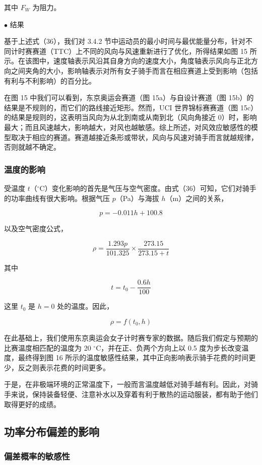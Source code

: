 \documentclass[11pt,a4paper]{ctexart}
\begin{document}
其中 $F_W$ 为阻力。

$\bullet$ 结果

基于上述式（36），我们对 3.4.2 节中运动员的最小时间与最优能量分布，针对不同计时赛赛道（TTC）上不同的风向与风速重新进行了优化，所得结果如图 15 所示。在该图中，速度轴表示风沿其自身方向的速度大小，角度轴表示风向与正北方向之间夹角的大小，影响轴表示对所有女子骑手而言在相应赛道上受到影响（包括有利与不利影响）的百分比。

在图 15 中我们可以看到，东京奥运会赛道（图 15a）与自设计赛道（图 15b）的结果是不规则的，而它们的路线接近矩形。然而，UCI 世界锦标赛赛道（图 15c）的结果是规则的，这表明当风向为从北到南或从南到北（风向角接近 0）时，影响最大；而且风速越大，影响越大，对风也越敏感。综上所述，对风效应敏感性的模型取决于相应的赛道。赛道越接近条形或带状，风向与风速对骑手而言就越规律，否则就越不确定。

\subsubsection{温度的影响}

受温度 $t$（$^{\circ}$C）变化影响的首先是气压与空气密度。由式（36）可知，它们对骑手的功率曲线有很大影响。根据气压 $p$（Pa）与海拔 $h$（m）之间的关系，

\[
p=-0.011h+100.8
\]

以及空气密度公式，

\[
\rho=\frac{1.293p}{101.325}\times\frac{273.15}{273.15+t}
\]

其中

\[
t=t_0-\frac{0.6h}{100}
\]

这里 $t_0$ 是 $h=0$ 处的温度。因此，

\[
\rho=f\left(t_0,h\right)
\]

在此基础上，我们使用东京奥运会女子计时赛专家的数据。随后我们假定与预期的比赛温度相匹配的温度为 20 $^{\circ}$C，并在正、负两个方向上以 0.5 度为步长改变温度，最终得到图 16 所示的温度敏感性结果，其中正向影响表示骑手花费的时间更少，反之则表示花费的时间更多。

于是，在非极端环境的正常温度下，一般而言温度越低对骑手越有利。因此，对骑手来说，保持装备轻便、注意补水以及穿着有利于散热的运动服装，都有助于他们取得更好的成绩。

\subsection{功率分布偏差的影响}

\subsubsection{偏差概率的敏感性}
\end{document}
